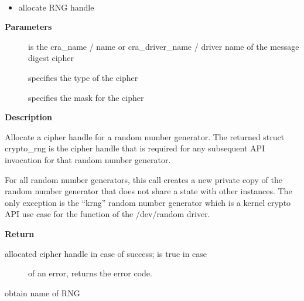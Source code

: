 \documentclass[a4paper,8pt,english]{sphinxmanual}
\begin{document}
\begin{fulllineitems}
\label{crypto/api-rng:c.crypto_alloc_rng}~\begin{itemize}
\item {} 
allocate RNG handle

\end{itemize}

\end{fulllineitems}


\textbf{Parameters}
\begin{description}
\item[{}] \leavevmode
is the cra\_name / name or cra\_driver\_name / driver name of the
message digest cipher

\item[{}] \leavevmode
specifies the type of the cipher

\item[{}] \leavevmode
specifies the mask for the cipher

\end{description}

\textbf{Description}

Allocate a cipher handle for a random number generator. The returned struct
crypto\_rng is the cipher handle that is required for any subsequent
API invocation for that random number generator.

For all random number generators, this call creates a new private copy of
the random number generator that does not share a state with other
instances. The only exception is the ``krng'' random number generator which
is a kernel crypto API use case for the  function of the
/dev/random driver.

\textbf{Return}
\begin{description}
\item[{allocated cipher handle in case of success;  is true in case}] \leavevmode
of an error,  returns the error code.

\end{description}

\begin{fulllineitems}
\label{crypto/api-rng:c.crypto_rng_alg}
obtain name of RNG

\end{fulllineitems}
\end{document}
